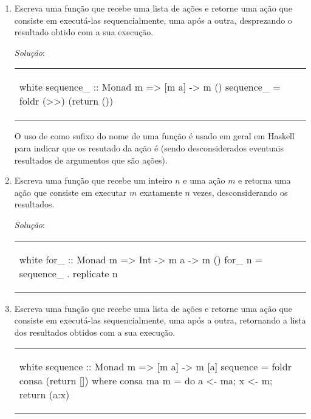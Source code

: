 \begin{enumerate}

\item Escreva uma função  que recebe uma lista de ações
  e retorne uma ação que consiste em executá-las sequencialmente, uma
  após a outra, desprezando o resultado obtido com a sua execução. 

{\em Solução\/}: 

\begin{center}
\begin{tabular}{l}
\begin{alg}{.5\textwidth}{white}
sequence_ :: Monad m => [m a] -> m ()
sequence_ = foldr (>>) (return ())
\end{alg}
\end{tabular}
\end{center}

O uso de \ina{_} como sufixo do nome de uma função é usado em geral em
Haskell para indicar que os resutado da ação é \ina{()} (sendo
desconsiderados eventuais resultados de argumentos que são ações).

\item Escreva uma função  que recebe um inteiro $n$ e uma
  ação $m$ e retorna uma ação que consiste em executar $m$ exatamente
  $n$ vezes, desconsiderando os resultados.

{\em Solução\/}: 

\begin{center}
\begin{tabular}{l}
\begin{alg}{.5\textwidth}{white}
for_ :: Monad m => Int -> m a -> m ()
for_ n = sequence_  . replicate n
\end{alg}
\end{tabular}
\end{center}

\item Escreva uma função  que recebe uma lista de ações
  e retorne uma ação que consiste em executá-las sequencialmente, uma
  após a outra, retornando a lista dos resultados obtidos com a sua
  execução.

\begin{center}
\begin{tabular}{l}
\begin{alg}{.5\textwidth}{white}
sequence :: Monad m => [m a] -> m [a]
sequence = foldr consa (return [])
  where consa ma m = do {a <- ma; x <- m; return (a:x)}
\end{alg}
\end{tabular}
\end{center}


\end{enumerate}
